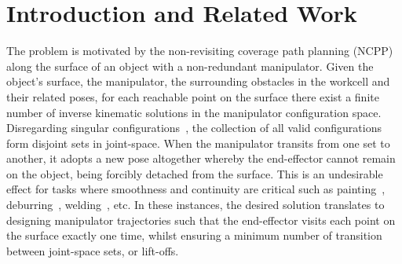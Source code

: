 \documentclass[conference]{IEEEtran}
\begin{document}
\section{Introduction and Related Work}
The problem is motivated by the non-revisiting coverage path planning (NCPP) along the surface of an object with a non-redundant manipulator. 
Given the object's surface, the manipulator, 
the surrounding obstacles in the workcell and their related poses, for each reachable point on the surface there exist a finite number of inverse kinematic solutions in the manipulator configuration space. 
Disregarding singular configurations~\cite{Yoshikawa1990Translational}, the collection of all valid configurations form disjoint sets in joint-space. When the manipulator transits from one set to another, it adopts a new pose altogether whereby the end-effector cannot remain on the object, being forcibly detached from the surface. This is an undesirable effect for tasks where smoothness and continuity are critical such as painting~\cite{li2011painting}, deburring~\cite{xie2016grinding}, welding~\cite{lee2011optimal}, etc. 
In these instances, the desired solution translates to designing manipulator trajectories such that the end-effector visits each point on the surface exactly one time, whilst ensuring a minimum number of transition between joint-space sets, or lift-offs. 

\end{document}
